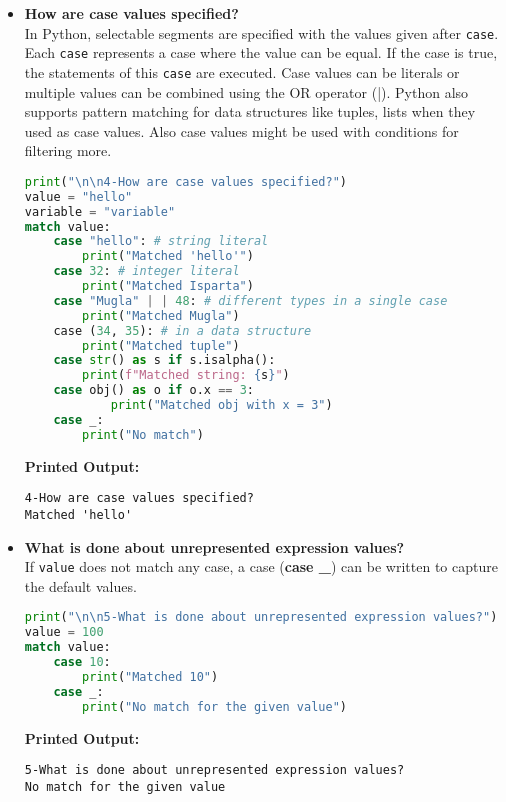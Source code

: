 \documentclass{article}
\begin{document}
\begin{itemize}
\item \textbf{How are case values specified?} \\
In Python, selectable segments are specified with the values given after \texttt{case}. Each \texttt{case} represents a case where the value can be equal. If the case is true, the statements of this \texttt{case} are executed. Case values can be literals or 
multiple values can be combined using the OR operator (|). Python also supports
pattern matching for data structures like tuples, lists when they used as case values. Also case values might be used with conditions for filtering more.
\begin{lstlisting}[language=Python]
print("\n\n4-How are case values specified?")
value = "hello"
variable = "variable"
match value:
    case "hello": # string literal
        print("Matched 'hello'")
    case 32: # integer literal
        print("Matched Isparta")
    case "Mugla" | | 48: # different types in a single case
        print("Matched Mugla")
    case (34, 35): # in a data structure
        print("Matched tuple")
    case str() as s if s.isalpha():
        print(f"Matched string: {s}")
    case obj() as o if o.x == 3:
            print("Matched obj with x = 3")
    case _:
        print("No match")
\end{lstlisting}
\textbf{Printed Output:} \begin{verbatim}
4-How are case values specified?
Matched 'hello'
\end{verbatim}



\item \textbf{What is done about unrepresented expression values?} \\
If \texttt{value} does not match any case, a case (\textbf{case \_}) can be written to capture the default values. 
\begin{lstlisting}[language=Python]
print("\n\n5-What is done about unrepresented expression values?")
value = 100
match value:
    case 10:
        print("Matched 10")
    case _:
        print("No match for the given value")
\end{lstlisting}
\textbf{Printed Output:} 
\begin{verbatim}
5-What is done about unrepresented expression values?
No match for the given value
\end{verbatim}

\end{itemize}
\newpage
\end{document}
